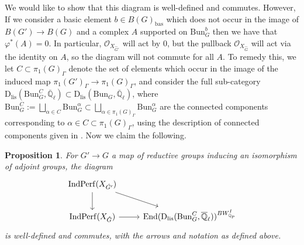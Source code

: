 \documentclass[reqno,11pt]{amsart}
\newtheorem{proposition}[theorem]{Proposition}
\theoremstyle{remark}
\newcommand{\bas}{\mathrm{bas}}
\newcommand{\Bun}{\mathrm{Bun}}
\newcommand{\Dlis}{\mathrm{D}_{\mathrm{lis}}}
\newcommand{\IndPerf}{\mathrm{IndPerf}}
\def\ol{\overline}
\def\ra{\rightarrow}
\begin{document}
We would like to show that this diagram is well-defined and commutes. However, If we consider a basic element $b \in B(G)_{\bas}$ which does not occur in the image of $B(G') \ra B(G)$ and a complex $A$ supported on $\Bun_{G}^{b}$ then we have that $\varphi^{*}(A) = 0$. In particular, $\mathcal{O}_{X_{\hat{G}'}}$ will act by $0$, but the pullback $\mathcal{O}_{X_{\hat{G}}}$ will act via the identity on $A$, so the diagram will not commute for all $A$. To remedy this, we let $C \subset \pi_{1}(G)_{\Gamma}$ denote the set of elements which occur in the image of the induced map $\pi_{1}(G')_{\Gamma} \ra \pi_{1}(G)_{\Gamma}$, and consider the full sub-category $\Dlis(\Bun_{G}^{C},\ol{\mathbb{Q}}_{\ell}) \subset \Dlis(\Bun_{G},\ol{\mathbb{Q}}_{\ell})$, where $\Bun_{G}^{C} := \bigsqcup_{\alpha \in C} \Bun_{G}^{\alpha} \subset \bigsqcup_{\alpha \in \pi_{1}(G)_{\Gamma}} \Bun_{G}^{\alpha}$ are the connected components corresponding to $\alpha \in C \subset \pi_{1}(G)_{\Gamma}$, using the description of connected components given in \cite[Corollary~IV.1.23]{FS}. Now we claim the following.
\begin{proposition}{\label{prop: actisogeny}}
For $G' \ra G$ a map of reductive groups inducing an isomorphism of adjoint groups, the diagram 
\begin{equation*}
\begin{tikzcd}
\IndPerf(X_{\hat{G'}}) \arrow[dr] \arrow[d] & \\
\IndPerf(X_{\hat{G}}) \arrow[r] &  \mathrm{End}(\Dlis(\Bun_{G}^{C},\ol{\mathbb{Q}}_{\ell}))^{BW_{\mathbb{Q}_{p}}^{I}}
\end{tikzcd}
\end{equation*}
is well-defined and commutes, with the arrows and notation as defined above. 
\end{proposition}
\end{document}
